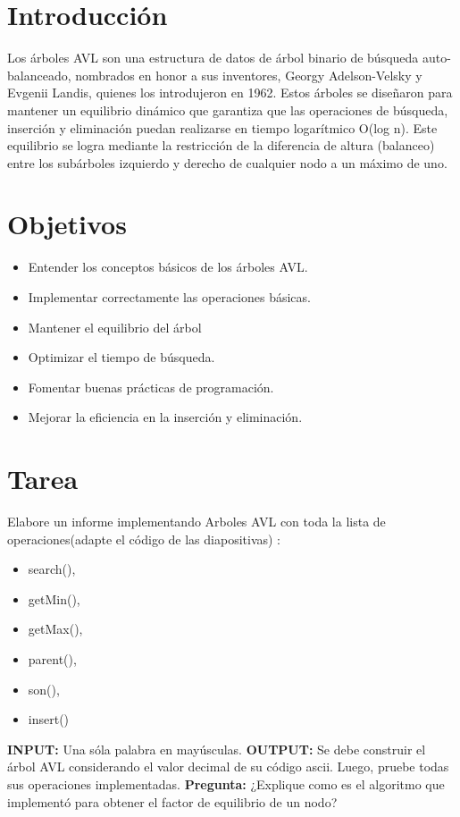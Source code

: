 \documentclass{article}
\begin{document}
  \section{Introducción}
  Los árboles AVL son una estructura de datos de árbol binario de búsqueda auto-balanceado, nombrados en honor a sus inventores, 
  Georgy Adelson-Velsky y Evgenii Landis, quienes los introdujeron en 1962. Estos árboles se diseñaron para mantener un 
  equilibrio dinámico que garantiza que las operaciones de búsqueda, inserción y eliminación puedan realizarse en tiempo 
  logarítmico O(log n). Este equilibrio se logra mediante la restricción de la diferencia de altura (balanceo) entre los 
  subárboles izquierdo y derecho de cualquier nodo a un máximo de uno.


  \section{Objetivos}
  \begin{itemize}
    \item Entender los conceptos básicos de los árboles AVL.
    \item Implementar correctamente las operaciones básicas.
    \item Mantener el equilibrio del árbol
    \item Optimizar el tiempo de búsqueda.
    \item Fomentar buenas prácticas de programación.
    \item Mejorar la eficiencia en la inserción y eliminación.
  \end{itemize}

 
	\section{Tarea}
  Elabore un informe implementando Arboles AVL con toda la lista de operaciones(adapte el código de las diapositivas) : 
  \begin{itemize}
    \item search(),
    \item getMin(), 
    \item getMax(), 
    \item parent(), 
    \item son(), 
    \item insert()
  \end{itemize}
  \textbf{INPUT:} Una sóla palabra en mayúsculas.\newline
  \textbf{OUTPUT:} Se debe construir el  árbol AVL considerando el valor decimal de su código ascii.
  Luego, pruebe todas sus operaciones implementadas.\newline
  \textbf{Pregunta:}
  ¿Explique como es el algoritmo que implementó para obtener el factor de equilibrio de un nodo?
 
\end{document}
